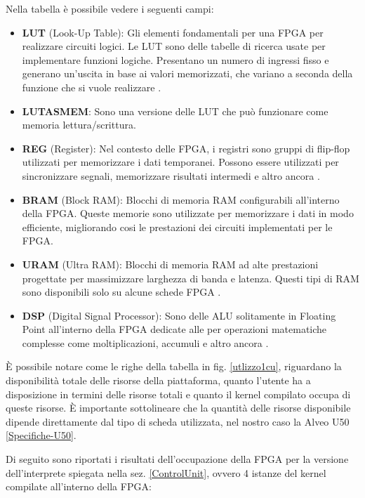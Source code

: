 \vspace{0.3cm}

\noindent Nella tabella è possibile vedere i seguenti campi:

\begin{itemize}
    \item \textbf{LUT} (Look-Up Table): Gli elementi fondamentali per una FPGA per realizzare circuiti logici. Le LUT sono delle tabelle di ricerca usate per implementare funzioni logiche. Presentano un numero di ingressi fisso e generano un'uscita in base ai valori memorizzati, che variano a seconda della funzione che si vuole realizzare \cite{sitoLUT}.
    \item \textbf{LUTASMEM}: Sono una versione delle LUT che può funzionare come memoria lettura/scrittura.
    \item \textbf{REG} (Register): Nel contesto delle FPGA, i registri sono gruppi di flip-flop utilizzati per memorizzare i dati temporanei. Possono essere utilizzati per sincronizzare segnali, memorizzare risultati intermedi e altro ancora \cite{sitoREG}. 
    \item \textbf{BRAM} (Block RAM): Blocchi di memoria RAM configurabili all'interno della FPGA. Queste memorie sono utilizzate per memorizzare i dati in modo efficiente, migliorando cosi le prestazioni dei circuiti implementati per le FPGA.
    \item \textbf{URAM} (Ultra RAM): Blocchi di memoria RAM ad alte prestazioni progettate per massimizzare larghezza di banda e latenza. Questi tipi di RAM sono disponibili solo su alcune schede FPGA \cite{sitoURAM}.
    \item \textbf{DSP} (Digital Signal Processor): Sono delle ALU solitamente in Floating Point all'interno della FPGA dedicate alle per operazioni matematiche complesse come moltiplicazioni, accumuli e altro ancora \cite{sitoDSP}. 
\end{itemize}

\noindent È possibile notare come le righe della tabella in fig. \ref{utlizzo1cu}, riguardano la disponibilità totale delle risorse della piattaforma, quanto l'utente ha a disposizione in termini delle risorse totali e quanto il kernel compilato occupa di queste risorse.
È importante sottolineare che la quantità delle risorse disponibile dipende direttamente dal tipo di scheda utilizzata, nel nostro caso la Alveo U50 \ref{Specifiche-U50}.

\vspace{0.3cm}

\noindent Di seguito sono riportati i risultati dell'occupazione della FPGA per la versione dell'interprete spiegata nella sez. \ref{ControlUnit}, ovvero 4 istanze del kernel compilate all'interno della FPGA:

